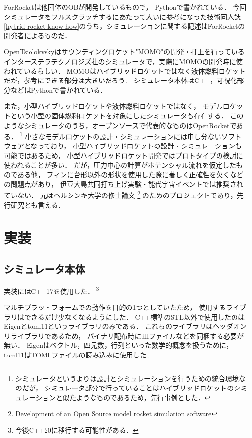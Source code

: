 \documentclass[a4j,10pt]{jsarticle}
\begin{document}
ForRocketは他団体のOBが開発しているもので，
Pythonで書かれている．
今回シミュレータをフルスクラッチするにあたって大いに参考になった技術同人誌
\ref{hybrid-rocket-know-how}のうち，シミュレーションに関する記述はForRocketの開発者によるものだ．

OpenTsiolokvskyはサウンディングロケット"MOMO"の開発・打上を行っている
インターステラテクノロジズ社のシミュレータで，実際にMOMOの開発時に使われているらしい．
MOMOはハイブリッドロケットではなく液体燃料ロケットだが，参考にできる部分は大きいだろう．
シミュレータ本体はC++，可視化部分などはPythonで書かれている．

また，小型ハイブリッドロケットや液体燃料ロケットではなく，
モデルロケットという小型の固体燃料ロケットを対象にしたシミュレータも存在する．
このようなシミュレータのうち，オープンソースで代表的なものはOpenRocketである．
\footnote{シミュレータというよりは設計とシミュレーションを行うための統合環境なのだが，
シミュレータ部分で行っていることはハイブリッドロケットのシミュレーションと似たようなものであるため，先行事例とした．}
小さなモデルロケットの設計・シミュレーションには申し分ないソフトウェアとなっており，
小型ハイブリッドロケットの設計・シミュレーションも可能ではあるため，
小型ハイブリッドロケット開発ではプロトタイプの検討に使われることが多い．
だが，圧力中心の計算がポテンシャル流れを仮定したものである他，
フィンに台形以外の形状を使用した際に著しく正確性を欠くなどの問題点があり，
伊豆大島共同打ち上げ実験・能代宇宙イベントでは推奨されていない．
元はヘルシンキ大学の修士論文
\footnote{Development of an Open Source model rocket simulation
software}
のためのプロジェクトであり，先行研究とも言える．


\section{実装}

\subsection{シミュレータ本体}

実装にはC++17を使用した．
\footnote{今後C++20に移行する可能性がある．}

マルチプラットフォームでの動作を目的の1つとしていたため，
使用するライブラリはできるだけ少なくなるようにした．
C++標準のSTL以外で使用したのはEigenとtoml11というライブラリのみである．
これらのライブラリはヘッダオンリライブラリであるため，
バイナリ配布時にdllファイルなどを同梱する必要が無い．
Eigenはベクトル，四元数，行列といった数学的概念を扱うために，
toml11はTOMLファイルの読み込みに使用した．
\end{document}
